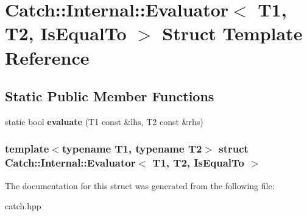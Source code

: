 \hypertarget{structCatch_1_1Internal_1_1Evaluator_3_01T1_00_01T2_00_01IsEqualTo_01_4}{
\section{Catch::Internal::Evaluator$<$ T1, T2, IsEqualTo $>$ Struct Template Reference}
\label{structCatch_1_1Internal_1_1Evaluator_3_01T1_00_01T2_00_01IsEqualTo_01_4}
}
\subsection*{Static Public Member Functions}
\begin{DoxyCompactItemize}
\item 
\hypertarget{structCatch_1_1Internal_1_1Evaluator_3_01T1_00_01T2_00_01IsEqualTo_01_4_a166b2b7849247397e63fb2940481b217}{
static bool {\bfseries evaluate} (T1 const \&lhs, T2 const \&rhs)}
\label{structCatch_1_1Internal_1_1Evaluator_3_01T1_00_01T2_00_01IsEqualTo_01_4_a166b2b7849247397e63fb2940481b217}

\end{DoxyCompactItemize}
\subsubsection*{template$<$typename T1, typename T2$>$ struct Catch::Internal::Evaluator$<$ T1, T2, IsEqualTo $>$}



The documentation for this struct was generated from the following file:\begin{DoxyCompactItemize}
\item 
catch.hpp\end{DoxyCompactItemize}
